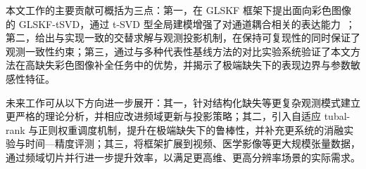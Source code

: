\documentclass[UTF8]{ctexart}
\begin{document}
本文工作的主要贡献可概括为三点：第一，在 GLSKF 框架下提出面向彩色图像的 GLSKF-tSVD，通过 t-SVD 型全局建模增强了对通道耦合相关的表达能力~\cite{zhang2017tsvd}；第二，给出与实现一致的交替求解与观测投影机制，在保持可复现性的同时保证了观测一致性约束；第三，通过与多种代表性基线方法的对比实验系统验证了本文方法在高缺失彩色图像补全任务中的优势，并揭示了极端缺失下的表现边界与参数敏感性特征。

未来工作可从以下方向进一步展开：其一，针对结构化缺失等更复杂观测模式建立更严格的理论分析，并相应改进频域更新与投影策略；其二，引入自适应 tubal-rank 与正则权重调度机制，提升在极端缺失下的鲁棒性，并补充更系统的消融实验与时间—精度评测；其三，将框架扩展到视频、医学影像等更大规模张量数据，通过频域切片并行进一步提升效率，以满足更高维、更高分辨率场景的实际需求。

\printbibliography
\end{document}
